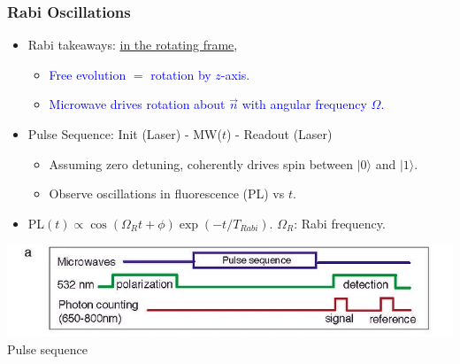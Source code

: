 \documentclass{beamer}
\begin{document}
\begin{frame}
\frametitle{Rabi Oscillations}
\begin{itemize}
    \item Rabi takeaways: \underline{in the rotating frame}, 
    \begin{itemize}
        \item \textcolor{blue}{Free evolution $=$ rotation by $z$-axis.} 
        \item \textcolor{blue}{Microwave drives rotation about $\vec{n}$ with angular frequency $\Omega$.} 
    \end{itemize}
    \item Pulse Sequence: Init (Laser) - MW($t$) - Readout (Laser)
    \begin{itemize}
        \item Assuming zero detuning, coherently drives spin between $|0\rangle$ and $|1\rangle$. 
        \item Observe oscillations in fluorescence (PL) vs $t$.
    \end{itemize}
    \item PL$(t) \propto \cos(\Omega_R t + \phi) \exp(-t/T_{Rabi})$. $\Omega_R$: Rabi frequency.
\end{itemize}
\vspace{1cm}
\begin{minipage}{0.7\textwidth}
    \centering
    \includegraphics[width=\linewidth]{presentation/figs/pulse.png} \\
    {\small Pulse sequence}
\end{minipage}

\end{frame}
\end{document}
